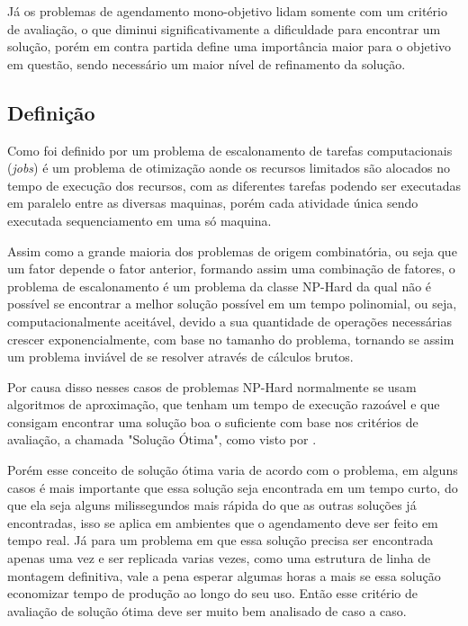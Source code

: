         Já os problemas de agendamento mono-objetivo lidam somente com um critério de avaliação, o que diminui significativamente a dificuldade para encontrar um solução, porém em contra partida define uma importância maior para o objetivo em questão, sendo necessário um maior nível de refinamento da solução.

    \subsection{Definição}
        Como foi definido por \cite{Bagchi1999} um problema de escalonamento de tarefas computacionais (\textit{jobs}) é um problema de otimização aonde os recursos limitados são alocados no tempo de execução dos recursos, com as diferentes tarefas podendo ser executadas em paralelo entre as diversas maquinas, porém cada atividade única sendo executada sequenciamento em uma só maquina.\newline

        Assim como a grande maioria dos problemas de origem combinatória, ou seja que um fator depende o fator anterior, formando assim uma combinação de fatores, o problema de escalonamento é um problema da classe NP-Hard da qual não é possível se encontrar a melhor solução possível em um tempo polinomial, ou seja, computacionalmente aceitável, devido a sua quantidade de operações necessárias crescer exponencialmente, com base no tamanho do problema, tornando se assim um problema inviável de se resolver através de cálculos brutos.\newline

        Por causa disso nesses casos de problemas NP-Hard normalmente se usam algoritmos de aproximação, que tenham um tempo de execução razoável e que consigam encontrar uma solução boa o suficiente com base nos critérios de avaliação, a chamada "Solução Ótima", como visto por \cite{Lawler1993}.\newline

        Porém esse conceito de solução ótima varia de acordo com o problema, em alguns casos é mais importante que essa solução seja encontrada em um tempo curto, do que ela seja alguns milissegundos mais rápida do que as outras soluções já encontradas, isso se aplica em ambientes que o agendamento deve ser feito em tempo real.\newline
        Já para um problema em que essa solução precisa ser encontrada apenas uma vez e ser replicada varias vezes, como uma estrutura de linha de montagem definitiva, vale a pena esperar algumas horas a mais se essa solução economizar tempo de produção ao longo do seu uso. Então esse critério de avaliação de solução ótima deve ser muito bem analisado de caso a caso. \newline

